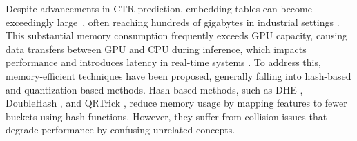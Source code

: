 


    Despite advancements in CTR prediction, embedding tables can become exceedingly large~\cite{others_1_scaling,other_10_entropy,others_2_td3}, often reaching hundreds of gigabytes in industrial settings \cite{QRTrick,BinaryCode,important_3_scaling}. 
    This substantial memory consumption frequently exceeds GPU capacity, causing data transfers between GPU and CPU during inference, which impacts performance and introduces latency in real-time systems \cite{wang2022merlin}. 
    To address this, memory-efficient techniques have been proposed, generally falling into hash-based and quantization-based methods. Hash-based methods, such as DHE \cite{DHE}, DoubleHash \cite{DoubleHash}, and QRTrick \cite{QRTrick}, reduce memory usage by mapping features to fewer buckets using hash functions. 
    However, they suffer from collision issues that degrade performance by confusing unrelated concepts.

